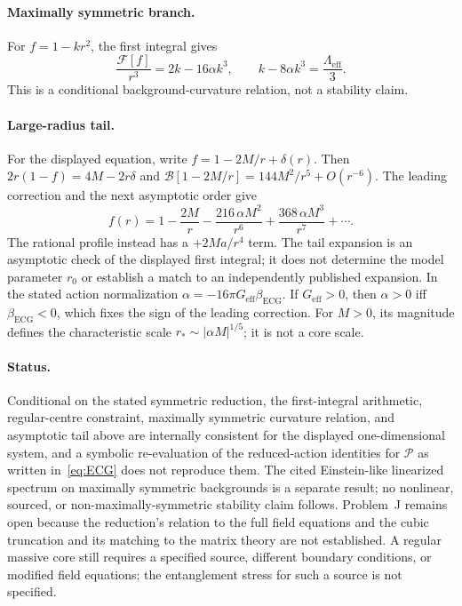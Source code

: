 \paragraph{Maximally symmetric branch.}
For \(f=1-kr^2\), the first integral gives
\[
\frac{\mathcal F[f]}{r^3}=2k-16\alpha k^3,\qquad
k-8\alpha k^3=\frac{\Lambda_{\mathrm{eff}}}{3}.
\]
This is a conditional background-curvature relation, not a stability
claim.

\paragraph{Large-radius tail.}
For the displayed equation, write \(f=1-2M/r+\delta(r)\). Then
\(2r(1-f)=4M-2r\delta\) and
\(\mathcal B[1-2M/r]=144M^2/r^5+O(r^{-6})\). The leading
correction and the next asymptotic order give
\[
f(r)=1-\frac{2M}{r}-\frac{216\,\alpha M^2}{r^6}
+\frac{368\,\alpha M^3}{r^7}+\cdots .
\]
The rational profile instead has a \(+2Ma/r^4\) term. The tail
expansion is an asymptotic check of the displayed first integral; it
does not determine the model parameter \(r_0\) or establish a match to
an independently published expansion. In the stated action
normalization \(\alpha=-16\pi G_{\mathrm{eff}}\beta_{\mathrm{ECG}}\).
If \(G_{\mathrm{eff}}>0\), then \(\alpha>0\) iff
\(\beta_{\mathrm{ECG}}<0\), which fixes the sign of the leading
correction. For \(M>0\), its magnitude defines the characteristic
scale \(r_*\sim|\alpha M|^{1/5}\); it is not a core scale.

\paragraph{Status.}
Conditional on the stated symmetric reduction, the first-integral
arithmetic, regular-centre constraint, maximally symmetric curvature
relation, and asymptotic tail above are internally consistent for the
displayed one-dimensional system, and a symbolic re-evaluation of the
reduced-action identities for \(\mathcal P\) as written in~\eqref{eq:ECG} does not reproduce them. The cited Einstein-like
linearized spectrum on maximally symmetric backgrounds is a separate
result; no nonlinear, sourced, or non-maximally-symmetric stability
claim follows. Problem~J
remains open because the reduction's relation to the full field
equations and the cubic truncation and its matching to the matrix
theory are not established. A regular massive core still requires a
specified source, different boundary conditions, or modified
field equations; the entanglement stress for such a source is not specified.

